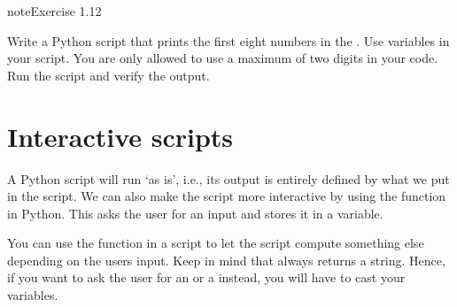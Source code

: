 \documentclass[letterpaper,10pt,english]{jupyterBook}
\begin{document}
\begin{sphinxadmonition}{note}{Exercise 1.12}

\sphinxAtStartPar
Write a Python script that prints the first eight numbers in the . Use variables in your script. You are only allowed to use a maximum of two digits in your code. Run the script and verify the output.
\end{sphinxadmonition}


\section{Interactive scripts}
\label{\detokenize{notebooks/01_GettingStarted/01_GettingStarted_student:interactive-scripts}}
\sphinxAtStartPar
A Python script will run ‘as is’, i.e., its output is entirely defined by what we put in the script. We can also make the script more interactive by using the  function in Python. This asks the user for an input and stores it in a variable.

\begin{sphinxVerbatim}[commandchars=\\\{\}]
  
\end{sphinxVerbatim}

\sphinxAtStartPar
You can use the  function in a script to let the script compute something else depending on the users input. Keep in mind that  always returns a string. Hence, if you want to ask the user for an  or a  instead, you will have to cast your variables.
\end{document}
